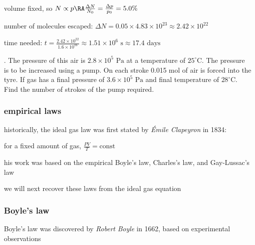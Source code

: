 \eqyskip

volume fixed, so $N \propto p \RA \frac{\Delta N}{N_0} = \frac{\Delta p}{p_0} = 5.0\%$

number of molecules escaped: $\Delta N = 0.05\times4.83\times10^{23} \approx 2.42 \times10^{22}$

time needed: $t = \frac{2.42 \times10^{22}}{1.6 \times 10^{16}} \approx 1.51 \times 10^6 \text{ s} \approx 17.4 \text{ days}$ \eoe

\newpage %


. The pressure of this air is $2.8\times10^5 \text{ Pa}$ at a temperature of $25^\circ$C. The pressure is to be increased using a pump. On each stroke 0.015 mol of air is forced into the tyre. If gas has a final pressure of $3.6\times10^5 \text{ Pa}$ and final temperature of $28^\circ$C. Find the number of strokes of the pump required.


\subsubsection{empirical laws}

historically, the ideal gas law was first stated by \emph{\'Emile Clapeyron} in 1834:

for a fixed amount of gas, $\boxed{\frac{PV}{T} = \text{const}}$

his work was based on the empirical Boyle's law, Charles's law, and Gay-Lussac's law

we will next recover these laws from the ideal gas equation

\subsubsection*{Boyle's law}

Boyle's law was discovered by \emph{Robert Boyle} in 1662, based on experimental observations

